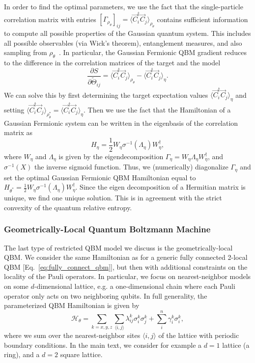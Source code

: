 \documentclass[
    aps,
    prx,
    floatfix,
    nofootinbib,
    onecolumn
]{revtex4-2}
\begin{document}
In order to find the optimal parameters, we use the fact that the single-particle correlation matrix with entries $ [\Gamma_{\rho_\theta}]_{ij} = \langle \vec{C}^\dagger_i \vec{C}_j \rangle_{\rho_\theta}$ contains sufficient information to compute all possible properties of the Gaussian quantum system. This includes all possible observables (via Wick's theorem), entanglement measures, and also sampling from $\rho_\theta$~\cite{Surace_2022}. In particular, the Gaussian Fermionic QBM gradient reduces to the difference in the correlation matrices of the target and the model
\begin{equation}
\frac{\partial S}{\partial \tilde{\Theta}_{ij}} = \langle \vec{C}^\dagger_i \vec{C}_j \rangle_{\rho_\theta} - \langle \vec{C}^\dagger_i \vec{C}_j \rangle_{\eta}.
\end{equation} 
We can solve this by first determining the target expectation values $\langle \vec{C}^\dagger_i \vec{C}_j \rangle_{\eta}$ and setting $\langle \vec{C}^\dagger_i \vec{C}_j \rangle_{\rho_\theta^*} = \langle \vec{C}^\dagger_i \vec{C}_j \rangle_{\eta}$. Then we use the fact that the Hamiltonian of a Gaussian Fermionic system can be written in the eigenbasis of the correlation matrix as 
\begin{equation}
     H_\eta =  \frac{1}{2} W_\eta \sigma^{-1}(\Lambda_\eta) W^\dagger_\eta,
\end{equation} 
where $W_\eta$ and $\Lambda_\eta$ is given by the eigendecomposition $\Gamma_{\eta} = W_\eta \Lambda_\eta W_\eta^\dagger$, and $\sigma^{-1}(X)$ the inverse sigmoid function. Thus, we (numerically) diagonalize $\Gamma_{\eta}$ and set the optimal Gaussian Fermionic QBM Hamiltonian equal to $H_{\theta^*}= \frac{1}{2}W_\eta \sigma^{-1}(\Lambda_\eta) W^\dagger_\eta$. Since the eigen decomposition of a Hermitian matrix is unique, we find one unique solution. This is in agreement with the strict convexity of the quantum relative entropy.

\subsubsection{Geometrically-Local Quantum Boltzmann Machine}

The last type of restricted QBM model we discuss is the geometrically-local QBM. 
We consider the same Hamiltonian as for a generic fully connected 2-local QBM [Eq.~\eqref{eq:fully_connect_qbm}], but then with additional constraints on the locality of the Pauli operators. In particular, we focus on nearest-neighbor models on some $d$-dimensional lattice, e.g. a one-dimensional chain where each Pauli operator only acts on two neighboring qubits. In full generality, the parameterized QBM Hamiltonian is given by \begin{equation} 
    \mathcal{H}_\theta = \sum_{k=x,y,z}\sum_{\langle i, j\rangle}\lambda^k_{ij}\sigma_i^k\sigma^k_j + \sum_i^n \gamma^k_i\sigma^k_i,
\end{equation} 
where we sum over the nearest-neighbor sites $\langle i,j \rangle$ of the lattice with periodic boundary conditions. In the main text, we consider for example a $d=1$ lattice (a ring), and a $d=2$ square lattice.
\end{document}

